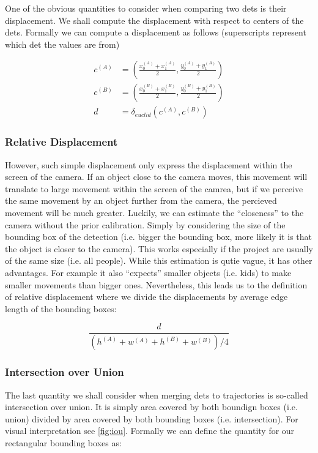 One of the obvious quantities to consider when comparing two \glspl{det} is
their displacement. We shall compute the displacement with respect to centers
of the \glspl{det}. Formally we can compute a displacement as follows
(superscripts represent which \gls{det} the values are from)

\begin{align*}
    c^{(A)} &= \left(\frac{x_0^{(A)} + x_1^{(A)}}{2}, \frac{y_0^{(A)} + y_1^{(A)}}{2}\right) \\
    c^{(B)} &= \left(\frac{x_0^{(B)} + x_1^{(B)}}{2}, \frac{y_0^{(B)} + y_1^{(B)}}{2}\right) \\
    d &= \delta_{euclid}(c^{(A)}, c^{(B)})
\end{align*}

\subsubsection{Relative Displacement}

However, such simple displacement only express the displacement within the
screen of the camera. If an object close to the camera moves, this movement
will translate to large movement within the screen of the camrea, but if we
perceive the same movement by an object further from the camera, the percieved
movement will be much greater. Luckily, we can estimate the ``closeness'' to the
camera without the prior calibration. Simply by considering the size of the
bounding box of the detection (i.e. bigger the bounding box, more likely it is
that the object is closer to the camera). This works especially if the project
are usually of the same size (i.e. all people). While this estimation is qutie
vague, it has other advantages. For example it also ``expects'' smaller objects
(i.e. kids) to make smaller movements than bigger ones. Nevertheless, this leads
us to the definition of relative displacement where we divide the displacements
by average edge length of the bounding boxes:

$$\frac{d}{\left(h^{(A)} + w^{(A)} + h^{(B)} + w^{(B)}\right) / 4}$$

\subsubsection{Intersection over Union}

The last quantity we shall consider when merging \glspl{det} to trajectories is 
so-called intersection over union. It is simply area covered by both boundign
boxes (i.e. union) divided by area covered by both bounding boxes (i.e.
intersection). For visual interpretation see \autoref{fig:iou}. Formally we can
define the quantity for our rectangular bounding boxes as:

